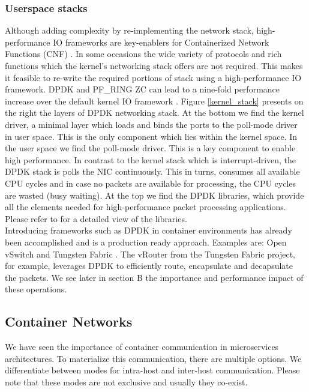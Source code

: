 \documentclass[conference]{IEEEtran}
\begin{document}
\subsubsection{Userspace stacks}
Although adding complexity by re-implementing the network stack, high-performance IO frameworks are key-enablers for Containerized Network Functions (CNF) \cite{SIGARCH_2017:Yang}. In some occasions the wide variety of protocols and rich functions which the kernel's networking stack offers are not required. This makes it feasible to re-write the required portions of stack using a high-performance IO framework. DPDK \cite{dpdk} and PF\_RING ZC \cite{pf_ring_zc} can lead to a nine-fold performance increase over the default kernel IO framework \cite{ANCS:Gallenmüller}. Figure \ref{kernel_stack} presents on the right the layers of DPDK networking stack. At the bottom we find the kernel driver, a minimal layer which loads and binds the ports to the poll-mode driver in user space. This is the only component which lies within the kernel space. In the user space we find the poll-mode driver. This is a key component to enable high performance. In contrast to the kernel stack which is interrupt-driven, the DPDK stack is polls the NIC continuously. This in turns, consumes all available CPU cycles and in case no packets are available for processing, the CPU cycles are wasted (busy waiting). At the top we find the DPDK libraries, which provide all the elements needed for high-performance packet processing applications. Please refer to \cite{dpdk} for a detailed view of the libraries.\\
Introducing frameworks such as DPDK in container environments has already been accomplished and is a production ready approach. Examples are: Open vSwitch \cite{ovs-dpdk} and Tungsten Fabric \cite{tungsten-dpdk}. The vRouter from the Tungsten Fabric project, for example, leverages DPDK to efficiently route, encapsulate and decapsulate the packets. We see later in section B the importance and performance impact of these operations.

\subsection{Container Networks}
We have seen the importance of container communication in microservices architectures. To materialize this communication, there are multiple options. We differentiate between modes for intra-host and inter-host communication.  Please note that these modes are not exclusive and usually they co-exist.
\end{document}
